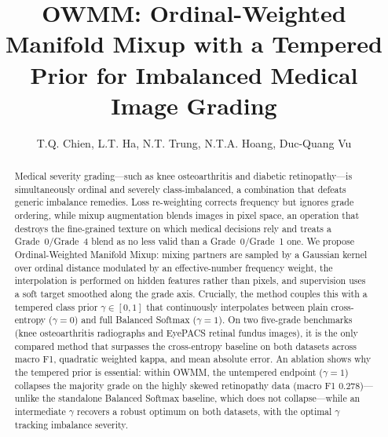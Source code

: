 \documentclass[runningheads]{svproc}
\begin{document}
\raggedbottom  %

\title{OWMM: Ordinal-Weighted Manifold Mixup with a Tempered Prior for Imbalanced Medical Image Grading}


\author{T.Q. Chien, L.T. Ha, N.T. Trung, N.T.A. Hoang, Duc-Quang Vu}


\maketitle

\begin{abstract}
Medical severity grading---such as knee osteoarthritis and diabetic retinopathy---is simultaneously ordinal and severely class-imbalanced, a combination that defeats generic imbalance remedies. Loss re-weighting corrects frequency but ignores grade ordering, while mixup augmentation blends images in pixel space, an operation that destroys the fine-grained texture on which medical decisions rely and treats a Grade~0/Grade~4 blend as no less valid than a Grade~0/Grade~1 one. We propose Ordinal-Weighted Manifold Mixup: mixing partners are sampled by a Gaussian kernel over ordinal distance modulated by an effective-number frequency weight, the interpolation is performed on hidden features rather than pixels, and supervision uses a soft target smoothed along the grade axis. Crucially, the method couples this with a tempered class prior $\gamma\in[0,1]$ that continuously interpolates between plain cross-entropy ($\gamma=0$) and full Balanced Softmax ($\gamma=1$). On two five-grade benchmarks (knee osteoarthritis radiographs and EyePACS retinal fundus images), it is the only compared method that surpasses the cross-entropy baseline on both datasets across macro F1, quadratic weighted kappa, and mean absolute error. An ablation shows why the tempered prior is essential: within OWMM, the untempered endpoint ($\gamma=1$) collapses the majority grade on the highly skewed retinopathy data (macro F1 $0.278$)---unlike the standalone Balanced Softmax baseline, which does not collapse---while an intermediate $\gamma$ recovers a robust optimum on both datasets, with the optimal $\gamma$ tracking imbalance severity.

\end{abstract}
\end{document}
